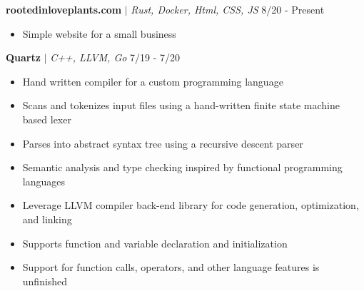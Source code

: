 \documentclass{article}
\newcommand{\project}[3]{\textbf{#1} $|$ \textit{#2} \hfill #3}
\newcommand{\makeListInner}[1]{\begin{itemize}[noitemsep,topsep=0pt] #1 \end{itemize}}
\newcommand{\makeList}[1]{\makeListInner{#1} \medskip}
\begin{document}
    \project{rootedinloveplants.com}{Rust, Docker, Html, CSS, JS}{8/20 - Present} \makeList{
        \item Simple website for a small business
    }


    \project{Quartz}{C++, LLVM, Go}{7/19 - 7/20} \makeList {
        \item Hand written compiler for a custom programming language
        \item Scans and tokenizes input files using a hand-written finite state machine based lexer
        \item Parses into abstract syntax tree using a recursive descent parser
        \item Semantic analysis and type checking inspired by functional programming languages
        \item Leverage LLVM compiler back-end library for code generation, optimization, and linking
        \item Supports function and variable declaration and initialization
        \item Support for function calls, operators, and other language features is unfinished
    }
\end{document}

